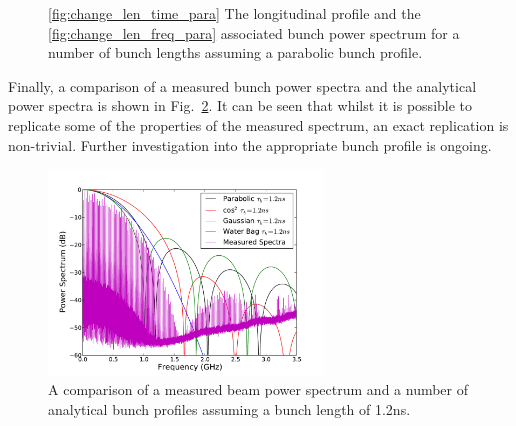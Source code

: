\begin{figure}
\caption{\ref{fig:change_len_time_para} The longitudinal profile and the \ref{fig:change_len_freq_para} associated bunch power spectrum for a number of bunch lengths assuming a parabolic bunch profile.}
\label{fig:diff_bunch_len_para}
\end{figure}

Finally, a comparison of a measured bunch power spectra and the analytical power spectra is shown in Fig.~\ref{fig:power_all}. It can be seen that whilst it is possible to replicate some of the properties of the measured spectrum, an exact replication is non-trivial. Further investigation into the appropriate bunch profile is ongoing.

\begin{figure}
\begin{center}
\includegraphics[width=0.65\textwidth]{Wakefields_and_Impedances/figures/beam_spectra_power_12ns.pdf}
\end{center}
\label{fig:power_all}
\caption{A comparison of a measured beam power spectrum and a number of analytical bunch profiles assuming a bunch length of 1.2ns.}
\end{figure}



